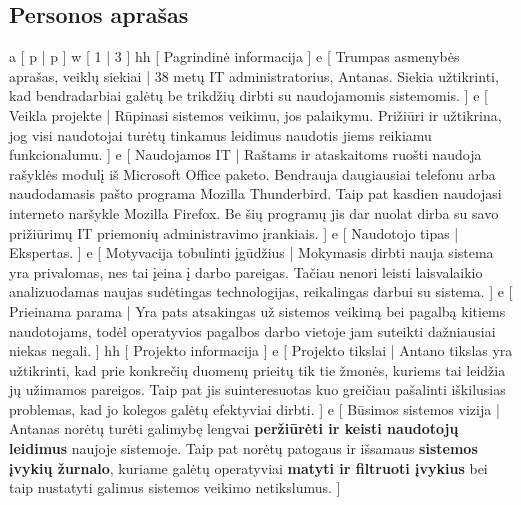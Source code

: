 \subsection{Personos aprašas}
\xtableu
{
  a [ p | p ]
  w [ 1 | 3 ]
  hh [ Pagrindinė informacija ]
  e [ Trumpas asmenybės aprašas, veiklų siekiai
  |
    38 metų IT administratorius, Antanas. Siekia užtikrinti, kad
    bendradarbiai galėtų be trikdžių dirbti su naudojamomis
    sistemomis.
  ]
  e [ Veikla projekte
  |
    Rūpinasi sistemos veikimu, jos palaikymu. Prižiūri ir užtikrina, jog visi naudotojai
    turėtų tinkamus leidimus naudotis jiems reikiamu funkcionalumu.
  ]
  e [ Naudojamos IT
  |
    Raštams ir ataskaitoms ruošti naudoja rašyklės modulį iš
    Microsoft Office paketo. Bendrauja daugiausiai telefonu arba
    naudodamasis pašto programa Mozilla Thunderbird. Taip pat kasdien
    naudojasi interneto naršykle Mozilla Firefox. Be šių programų
    jis dar nuolat dirba su savo prižiūrimų IT priemonių administravimo 
    įrankiais.
  ]
  e [ Naudotojo tipas
  |
    Ekspertas.
  ]
  e [ Motyvacija tobulinti įgūdžius
  |
    Mokymasis dirbti nauja sistema yra privalomas, nes tai įeina į darbo pareigas. Tačiau nenori
    leisti laisvalaikio analizuodamas naujas sudėtingas technologijas, reikalingas darbui su sistema.
  ]
  e [ Prieinama parama
  |
    Yra pats atsakingas už sistemos veikimą bei pagalbą kitiems naudotojams, todėl operatyvios pagalbos
    darbo vietoje jam suteikti dažniausiai niekas negali.
  ]
  hh [ Projekto informacija ]
  e [ Projekto tikslai
  |
    Antano tikslas yra užtikrinti, kad prie konkrečių duomenų prieitų
    tik tie žmonės, kuriems tai leidžia jų užimamos pareigos. Taip
    pat jis suinteresuotas kuo greičiau pašalinti iškilusias problemas,
    kad jo kolegos galėtų efektyviai dirbti.
  ]
  e [ Būsimos sistemos vizija
  |
    Antanas norėtų turėti galimybę lengvai \textbf{peržiūrėti ir
    keisti naudotojų leidimus} naujoje sistemoje. Taip pat norėtų
    patogaus ir išsamaus \textbf{sistemos įvykių žurnalo}, kuriame
    galėtų operatyviai \textbf{matyti ir filtruoti įvykius} bei taip
    nustatyti galimus sistemos veikimo netikslumus.
  ]
}

